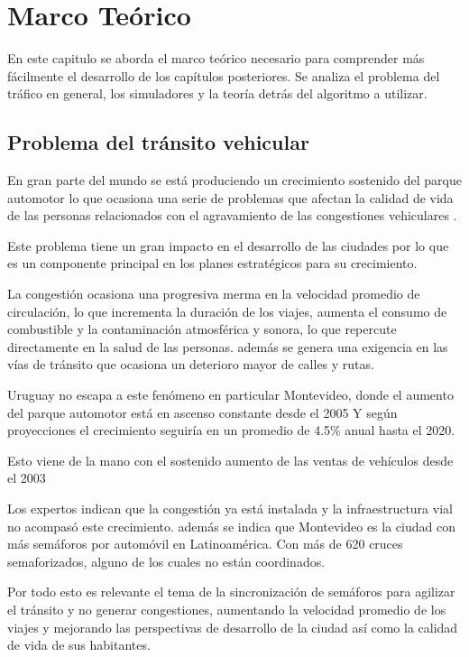 \chapter{Marco Teórico}

 En este capitulo se aborda el marco teórico necesario para comprender más fácilmente el desarrollo de los capítulos posteriores. Se analiza el problema del tráfico en general, los simuladores y la teoría detrás del algoritmo a utilizar.

\section{Problema del tránsito vehicular}

En gran parte del mundo se está produciendo un crecimiento sostenido del parque automotor lo que ocasiona una serie de problemas que afectan la calidad de vida de las personas relacionados con el agravamiento de las congestiones vehiculares \citep{Cepal2003}.

Este problema tiene un gran impacto en el desarrollo de las ciudades por lo que es un componente principal en los planes estratégicos para su crecimiento.

La congestión ocasiona una progresiva merma en la velocidad promedio de circulación, lo que incrementa la duración de los viajes, aumenta el consumo de combustible y la contaminación atmosférica y sonora, lo que repercute directamente en la salud de las personas. 
además se genera una exigencia en las vías de tránsito que ocasiona un deterioro mayor de calles y rutas.

Uruguay no escapa a este fenómeno en particular Montevideo, donde el aumento del parque automotor está en ascenso constante desde el 2005 \citep{INE2014} 
Y según proyecciones el crecimiento seguiría en un promedio de 4.5\% anual hasta el 2020. \citep{BBVA2013}

Esto viene de la mano con el sostenido aumento de las ventas de vehículos  desde el 2003 \citep{Autoanuario2014}

Los expertos indican que la congestión ya está instalada y la infraestructura vial no acompasó este crecimiento. además se indica que Montevideo es la ciudad con más semáforos por automóvil en Latinoamérica. Con más de 620 cruces semaforizados, alguno de los cuales no están coordinados.\citep{Subrayado2013}

Por todo esto es relevante el tema de la sincronización de semáforos para agilizar el tránsito y no generar congestiones, aumentando la velocidad promedio de los viajes y mejorando las perspectivas de desarrollo de la ciudad así como la calidad de vida de sus habitantes.

